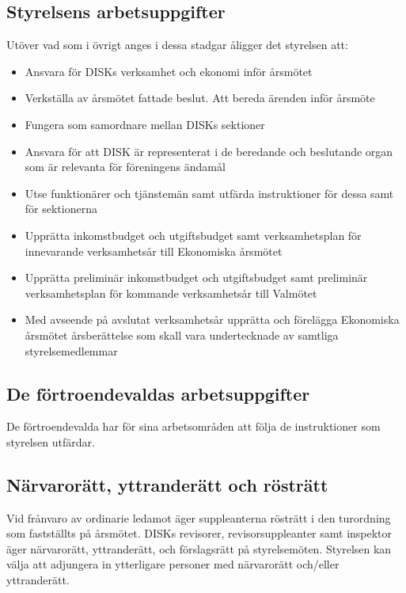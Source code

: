        \subsection{Styrelsens arbetsuppgifter}
        \label{subsec:styrelsensarbetsuppgifter}
                Utöver vad som i övrigt anges i dessa stadgar åligger det styrelsen att:
                \begin{itemize}
                \setlength{\itemsep}{0.0cm}
                \setlength{\parskip}{0.0cm}
                        \item Ansvara för DISKs verksamhet och ekonomi inför årsmötet
                        \item Verkställa av årsmötet fattade beslut. Att bereda ärenden inför årsmöte
                        \item Fungera som samordnare mellan DISKs sektioner

                        \item Ansvara för att DISK är representerat i de beredande och beslutande organ som är relevanta för föreningens ändamål

                        \item Utse funktionärer och tjänstemän samt utfärda instruktioner för dessa samt för sektionerna
                        \item Upprätta inkomstbudget och utgiftsbudget samt verksamhetsplan för innevarande verksamhetsår till Ekonomiska årsmötet
                        \item Upprätta preliminär inkomstbudget och utgiftsbudget samt preliminär verksamhetsplan för kommande verksamhetsår till Valmötet
                        \item Med avseende på avslutat verksamhetsår upprätta och förelägga Ekonomiska årsmötet årsberättelse som skall vara undertecknade av samtliga styrelsemedlemmar
                \end{itemize}

\clearpage
        \subsection{De förtroendevaldas arbetsuppgifter}
        \label{subsec:defortroendevaldasarbetsuppgifter}
                De förtroendevalda har för sina arbetsområden att följa de instruktioner som styrelsen utfärdar.

        \subsection{Närvarorätt, yttranderätt och rösträtt}
        \label{subsec:narvarorattyttranderattochrostratt}
                Vid frånvaro av ordinarie ledamot äger suppleanterna rösträtt i den turordning som fastställts på årsmötet. DISKs revisorer, revisorsuppleanter samt inspektor äger närvarorätt, yttranderätt, och förslagsrätt på styrelsemöten. Styrelsen kan välja att adjungera in ytterligare personer med närvarorätt och/eller yttranderätt.

